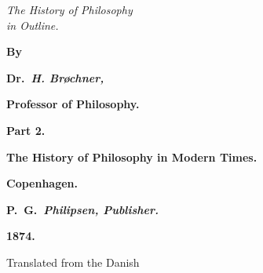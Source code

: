 \begin{center}
  {\LARGE \emph{The History of Philosophy}}\\[8pt]
  {\LARGE \emph{in Outline.}}
\end{center}
\vspace{18pt}
\begin{center}
  \textbf{By}
\end{center}
\vspace{10pt}
\begin{center}
  \textbf{Dr.\ \emph{H. Brøchner,}}
\end{center}
\begin{center}
  \textbf{Professor of Philosophy.}
\end{center}
\vspace{14pt}
\dblrule
\vspace{14pt}
\begin{center}
  \textbf{Part 2.}
\end{center}
\begin{center}
  \textbf{\large The History of Philosophy in Modern Times.}
\end{center}
\vspace{14pt}
\dblrule
\vspace{18pt}
\begin{center}
  \textbf{Copenhagen.}
\end{center}
\begin{center}
  \textbf{P.\ G.\ \emph{Philipsen, Publisher.}}
\end{center}
\begin{center}
  \textbf{1874.}
\end{center}
\vfill
\begin{center}
  \small Translated from the Danish
\end{center}
\newpage
\thispagestyle{empty}

